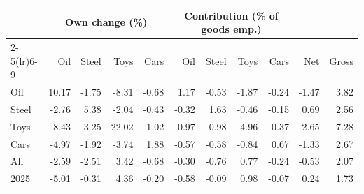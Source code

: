 \begin{tabular}{lrrrrrrrrrr}
\toprule
 & \multicolumn{4}{c}{Own change (\%)} & \multicolumn{4}{c}{Contribution (\% of goods emp.)} & & \\
\cmidrule(lr){2-5}\cmidrule(lr){6-9}
 & Oil & Steel & Toys & Cars & Oil & Steel & Toys & Cars & Net & Gross \\
\midrule
Oil & 10.17 & -1.75 & -8.31 & -0.68 & 1.17 & -0.53 & -1.87 & -0.24 & -1.47 & 3.82 \\
Steel & -2.76 & 5.38 & -2.04 & -0.43 & -0.32 & 1.63 & -0.46 & -0.15 & 0.69 & 2.56 \\
Toys & -8.43 & -3.25 & 22.02 & -1.02 & -0.97 & -0.98 & 4.96 & -0.37 & 2.65 & 7.28 \\
Cars & -4.97 & -1.92 & -3.74 & 1.88 & -0.57 & -0.58 & -0.84 & 0.67 & -1.33 & 2.67 \\
All & -2.59 & -2.51 & 3.42 & -0.68 & -0.30 & -0.76 & 0.77 & -0.24 & -0.53 & 2.07 \\
2025 & -5.01 & -0.31 & 4.36 & -0.20 & -0.58 & -0.09 & 0.98 & -0.07 & 0.24 & 1.73 \\
\bottomrule
\end{tabular}
